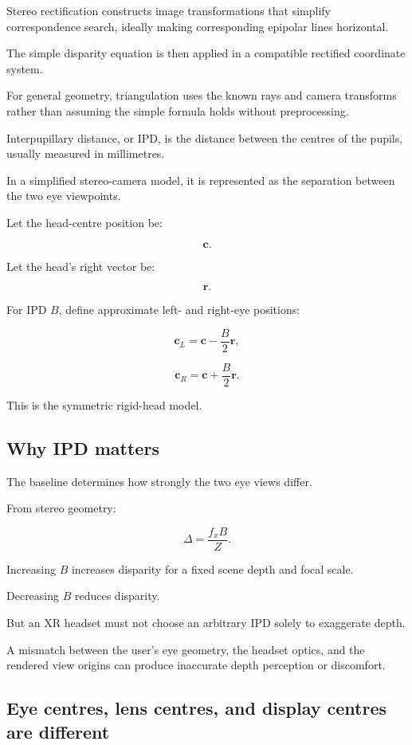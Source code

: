 Stereo rectification constructs image transformations that simplify correspondence search, ideally making corresponding epipolar lines horizontal.

The simple disparity equation is then applied in a compatible rectified coordinate system.

For general geometry, triangulation uses the known rays and camera transforms rather than assuming the simple formula holds without preprocessing.

Interpupillary distance, or IPD, is the distance between the centres of the pupils, usually measured in millimetres.

In a simplified stereo-camera model, it is represented as the separation between the two eye viewpoints.

Let the head-centre position be:

\[ \mathbf c. \]

Let the head's right vector be:

\[ \mathbf r. \]

For IPD \(B\), define approximate left- and right-eye positions:

\[ \boxed{ \mathbf c_L=\mathbf c-\frac B2\mathbf r, } \]

\[ \boxed{ \mathbf c_R=\mathbf c+\frac B2\mathbf r. } \]

This is the symmetric rigid-head model.

\subsection{Why IPD matters}\label{02-foundations-ii-ch035-why-ipd-matters}

The baseline determines how strongly the two eye views differ.

From stereo geometry:

\[ \Delta=\frac{f_xB}{Z}. \]

Increasing \(B\) increases disparity for a fixed scene depth and focal scale.

Decreasing \(B\) reduces disparity.

But an XR headset must not choose an arbitrary IPD solely to exaggerate depth.

A mismatch between the user's eye geometry, the headset optics, and the rendered view origins can produce inaccurate depth perception or discomfort.

\subsection{Eye centres, lens centres, and display centres are different}\label{02-foundations-ii-ch035-eye-centres-lens-centres-and-display-centres-are-different}

